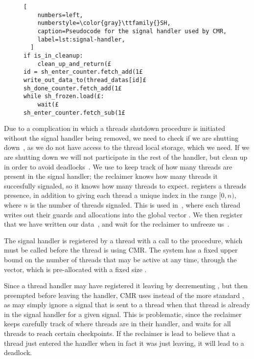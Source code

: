 \begin{figure}[b]
  \begin{lstlisting}[
    numbers=left,
    numberstyle=\color{gray}\ttfamily{}SH,
    caption=Pseudocode for the signal handler used by CMR,
    label=lst:signal-handler,
  ]
if is_in_cleanup:
    clean_up_and_return(£
id = sh_enter_counter.fetch_add(1£
write_out_data_to(thread_datas[id]£
sh_done_counter.fetch_add(1£
while sh_frozen.load(£:
    wait(£
sh_enter_counter.fetch_sub(1£\end{lstlisting}
\end{figure}

Due to a complication in which a threads shutdown procedure is initiated without the signal handler
being removed, we need to check if we are shutting down~, as we do not have access to
the thread local storage, which we need. If we are shutting down we will not participate in the
rest of the handler, but clean up in order to avoid deadlocks~.
We use  to keep track of how many threads are present in the signal handler;
the reclaimer knows how many threads it succesfully signaled, so it knows how many threads to
expect.  registers a threads presence, in addition to giving each thread a unique
index in the range $[0, n)$, where $n$ is the number of threads signaled. This is used
in~, where each thread writes out their guards and allocations into the global vector
. We then register that we have written our data~, and wait for the
reclaimer to unfreeze us~.



The signal handler is registered by a thread with a call to the  procedure,
which must be called before the thread is using CMR\@. 
The system has a fixed upper bound on the number of threads that may be active at any time, through
the  vector, which is pre-allocated with a fixed size .

Since a thread handler may have registered it leaving by decrementing ,
but then preempted before leaving the handler, CMR uses  instead of the more
standard , as  may simply ignore a signal that is sent to a
thread when that thread is already in the signal handler for a given signal.
This is problematic, since the reclaimer keeps carefully track of where threads are in their
handler, and waits for all threads to reach certain checkpoints. If the reclaimer is lead to
believe that a thread just entered the handler when in fact it was just leaving, it will lead to a
deadlock.


